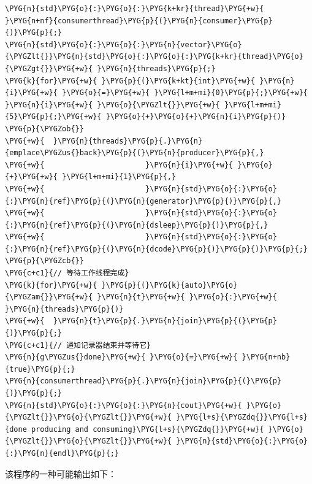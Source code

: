 \begin{codeblockbg}
\begin{Verbatim}[commandchars=\\\{\},breaklines=true,breakanywhere=true,fontsize=\codefont,xleftmargin=17bp]
\PYG{n}{std}\PYG{o}{:}\PYG{o}{:}\PYG{k+kr}{thread}\PYG{+w}{ }\PYG{n+nf}{consumerthread}\PYG{p}{(}\PYG{n}{consumer}\PYG{p}{)}\PYG{p}{;}
\PYG{n}{std}\PYG{o}{:}\PYG{o}{:}\PYG{n}{vector}\PYG{o}{\PYGZlt{}}\PYG{n}{std}\PYG{o}{:}\PYG{o}{:}\PYG{k+kr}{thread}\PYG{o}{\PYGZgt{}}\PYG{+w}{ }\PYG{n}{threads}\PYG{p}{;}
\PYG{k}{for}\PYG{+w}{ }\PYG{p}{(}\PYG{k+kt}{int}\PYG{+w}{ }\PYG{n}{i}\PYG{+w}{ }\PYG{o}{=}\PYG{+w}{ }\PYG{l+m+mi}{0}\PYG{p}{;}\PYG{+w}{ }\PYG{n}{i}\PYG{+w}{ }\PYG{o}{\PYGZlt{}}\PYG{+w}{ }\PYG{l+m+mi}{5}\PYG{p}{;}\PYG{+w}{ }\PYG{o}{+}\PYG{o}{+}\PYG{n}{i}\PYG{p}{)}
\PYG{p}{\PYGZob{}}
\PYG{+w}{  }\PYG{n}{threads}\PYG{p}{.}\PYG{n}{emplace\PYGZus{}back}\PYG{p}{(}\PYG{n}{producer}\PYG{p}{,}
\PYG{+w}{                       }\PYG{n}{i}\PYG{+w}{ }\PYG{o}{+}\PYG{+w}{ }\PYG{l+m+mi}{1}\PYG{p}{,}
\PYG{+w}{                       }\PYG{n}{std}\PYG{o}{:}\PYG{o}{:}\PYG{n}{ref}\PYG{p}{(}\PYG{n}{generator}\PYG{p}{)}\PYG{p}{,}
\PYG{+w}{                       }\PYG{n}{std}\PYG{o}{:}\PYG{o}{:}\PYG{n}{ref}\PYG{p}{(}\PYG{n}{dsleep}\PYG{p}{)}\PYG{p}{,}
\PYG{+w}{                       }\PYG{n}{std}\PYG{o}{:}\PYG{o}{:}\PYG{n}{ref}\PYG{p}{(}\PYG{n}{dcode}\PYG{p}{)}\PYG{p}{)}\PYG{p}{;}
\PYG{p}{\PYGZcb{}}
\PYG{c+c1}{// 等待工作线程完成}
\PYG{k}{for}\PYG{+w}{ }\PYG{p}{(}\PYG{k}{auto}\PYG{o}{\PYGZam{}}\PYG{+w}{ }\PYG{n}{t}\PYG{+w}{ }\PYG{o}{:}\PYG{+w}{ }\PYG{n}{threads}\PYG{p}{)}
\PYG{+w}{  }\PYG{n}{t}\PYG{p}{.}\PYG{n}{join}\PYG{p}{(}\PYG{p}{)}\PYG{p}{;}
\PYG{c+c1}{// 通知记录器结束并等待它}
\PYG{n}{g\PYGZus{}done}\PYG{+w}{ }\PYG{o}{=}\PYG{+w}{ }\PYG{n+nb}{true}\PYG{p}{;}
\PYG{n}{consumerthread}\PYG{p}{.}\PYG{n}{join}\PYG{p}{(}\PYG{p}{)}\PYG{p}{;}
\PYG{n}{std}\PYG{o}{:}\PYG{o}{:}\PYG{n}{cout}\PYG{+w}{ }\PYG{o}{\PYGZlt{}}\PYG{o}{\PYGZlt{}}\PYG{+w}{ }\PYG{l+s}{\PYGZdq{}}\PYG{l+s}{done producing and consuming}\PYG{l+s}{\PYGZdq{}}\PYG{+w}{ }\PYG{o}{\PYGZlt{}}\PYG{o}{\PYGZlt{}}\PYG{+w}{ }\PYG{n}{std}\PYG{o}{:}\PYG{o}{:}\PYG{n}{endl}\PYG{p}{;}
\end{Verbatim}
\end{codeblockbg}



该程序的一种可能输出如下：



